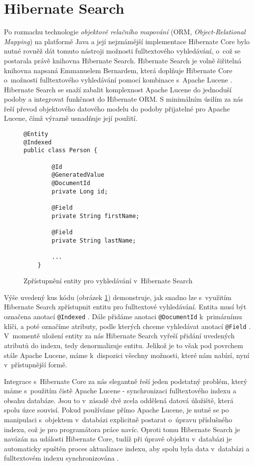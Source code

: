 \documentclass[11pt,oneside]{fithesis2}
\begin{document}
\section{Hibernate Search}
Po rozmachu technologie \emph{objektově relačního mapování} (ORM, \emph{Object-Relational Mapping}) na platformě Java a její nejznámější implementace Hibernate Core \cite[s.~29]{HibernateSearchAction} bylo nutné rovněž dát tomuto nástroji možnosti fulltextového vyhledávání, o~což se postarala právě knihovna Hibernate Search. Hibernate Search je volně šiřitelná knihovna napsaná Emmanuelem Bernardem, která doplňuje Hibernate Core o~možnosti fulltextového vyhledávání pomocí kombinace s~Apache Lucene  \cite[s.~29]{HibernateSearchAction}. Hibernate Search se snaží zabalit komplexnost Apache Lucene do jednoduší podoby a integrovat funkčnost do Hibernate ORM. S minimálním úsilím za nás řeší převod objektového datového modelu do podoby přijatelné pro Apache Lucene, čímž výrazně usnadňuje její použití.

\begin{figure}[!htbp]
\begin{verbatim}
@Entity
@Indexed
public class Person {

		@Id 
		@GeneratedValue
		@DocumentId
		private Long id;

		@Field
		private String firstName;

		@Field 
		private String lastName;

		...
	}
	\end{verbatim}
	\caption{Zpřístupnění entity pro vyhledávání v~Hibernate Search}
	\label{ExampleHibernateSearch}
\end{figure}

Výše uvedený kus kódu (obrázek \ref{ExampleHibernateSearch}) demonstruje, jak snadno lze s~využitím Hibernate Search zpřístupnit entitu pro fulltextové vyhledávání. Entita musí být označena anotací \texttt{@Indexed}  \cite[s.~38]{HibernateSearchAction}. Dále přidáme anotaci \texttt{@DocumentId} k~primárnímu klíči, a poté označíme atributy, podle kterých chceme vyhledávat anotací \texttt{@Field}  \cite[s.~38]{HibernateSearchAction}. V~momentě uložení entity za nás Hibernate Search vyřeší přidání uvedených atributů do indexu, tedy denormalizuje entitu. Jelikož je to však pod povrchem stále Apache Lucene, máme k~dispozici všechny možnosti, které nám nabízí, nyní v~přístupnější formě.

Integrace s~Hibernate Core za nás elegantně řeší jeden podstatný problém, který máme s~použitím čistě Apache Lucene - synchronizaci fulltextového indexu a obsahu databáze. Jsou to v~zásadě dvě zcela oddělená datová úložiště, která spolu úzce souvisí. Pokud používáme přímo Apache Lucene, je nutné se po manipulaci s~objektem v~databázi explicitně postarat o~úpravu příslušného indexu, což je pro programátora práce navíc. Oproti tomu Hibernate Search je navázán na události Hibernate Core, tudíž při úpravě objektu v~databázi je automaticky spuštěn proces aktualizace indexu, aby spolu byla data v~databázi a fulltextovém indexu synchronizována  \cite[s.~24]{HibernateSearchAction}. 
\end{document}

